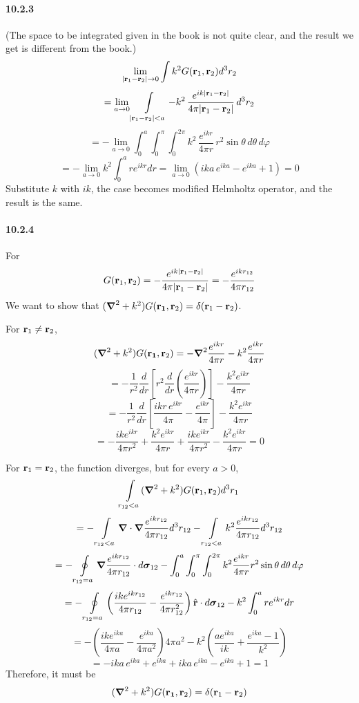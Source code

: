 \documentclass[a4paper]{article}
\begin{document}
\paragraph{10.2.3}
(The space to be integrated given in the book is not quite clear, and the result we get is different from the book.)
\[
\lim_{|\mathbf{r}_1-\mathbf{r}_2|\to0}\int k^2G(\mathbf{r}_1,\mathbf{r}_2)d^3r_2
\]
\[
=\lim_{a\to0}\int\displaylimits_{|\mathbf{r}_1-\mathbf{r}_2|<a}-k^2\,\frac{e^{ik|\mathbf{r}_1-\mathbf{r}_2|}}{4\pi |\mathbf{r}_1-\mathbf{r}_2|}\,d^3r_2
\]
\[
=-\lim_{a\to0}\int_0^a\int_0^\pi\int_0^{2\pi}k^2\,\frac{e^{ikr}}{4\pi r}\,r^2\sin\theta\,d\theta\,d\varphi
\]
\[
=-\lim_{a\to0}k^2\int_0^a re^{ikr}dr
=\lim_{a\to0}(ika\,e^{ika}-e^{ika}+1)=0
\]
Substitute $k$ with $ik$, the case becomes modified Helmholtz operator, and the result is the same.

\paragraph{10.2.4}
For
\[
G(\mathbf{r}_1,\mathbf{r}_2)=-\frac{e^{ik|\mathbf{r}_1-\mathbf{r}_2|}}{4\pi|\mathbf{r}_1-\mathbf{r}_2|}=-\frac{e^{ikr_{12}}}{4\pi r_{12}}
\]
We want to show that $(\boldsymbol{\nabla}^2+k^2)G(\mathbf{r_1},\mathbf{r}_2)=\delta(\mathbf{r}_1-\mathbf{r}_2)$.

For $\mathbf{r}_1\neq\mathbf{r}_2$, 
\[
(\boldsymbol{\nabla}^2+k^2)G(\mathbf{r_1},\mathbf{r}_2)=-\boldsymbol{\nabla}^2\frac{e^{ikr}}{4\pi r}-k^2\frac{e^{ikr}}{4\pi r}
\]
\[
=-\frac{1}{r^2}\frac{d}{dr}\left[r^2\frac{d}{dr}(\frac{e^{ikr}}{4\pi r}) \right]-\frac{k^2e^{ikr}}{4\pi r}
\]
\[
=-\frac{1}{r^2}\frac{d}{dr}\left[\frac{ikr\,e^{ikr}}{4\pi}-\frac{e^{ikr}}{4\pi} \right]-\frac{k^2e^{ikr}}{4\pi r}
\]
\[
=-\frac{ike^{ikr}}{4\pi r^2}+\frac{k^2e^{ikr}}{4\pi r}+\frac{ike^{ikr}}{4\pi r^2}-\frac{k^2e^{ikr}}{4\pi r}=0
\]

For $\mathbf{r}_1=\mathbf{r}_2$, the function diverges, but for every $a>0$,
\[
\int\displaylimits_{r_{12}<a}(\boldsymbol{\nabla}^2+k^2)G(\mathbf{r}_1,\mathbf{r}_2)d^3r_1
\]
\[
=-\int\displaylimits_{r_{12}<a}\boldsymbol{\nabla}\cdot\boldsymbol{\nabla}\frac{e^{ikr_{12}}}{4\pi r_{12}}d^3r_{12}-\int\displaylimits_{r_{12}<a}k^2\frac{e^{ikr_{12}}}{4\pi r_{12}}d^3r_{12}
\]
\[
=-\oint\displaylimits_{r_{12}=a}\boldsymbol{\nabla}\frac{e^{ikr_{12}}}{4\pi r_{12}}\cdot d\boldsymbol{\sigma}_{12}-\int_0^a\int_0^\pi\int_0^{2\pi}k^2\frac{e^{ikr}}{4\pi r}r^2\sin\theta\,d\theta\,d\varphi
\]
\[
=-\oint\displaylimits_{r_{12}=a}\left(\frac{ike^{ikr_{12}}}{4\pi r_{12}}-\frac{e^{ikr_{12}}}{4\pi r_{12}^2} \right)\hat{\mathbf{r}}\cdot d\boldsymbol{\sigma}_{12}-k^2\int_0^a re^{ikr}dr
\]
\[
=-\left(\frac{ike^{ika}}{4\pi a}-\frac{e^{ika}}{4\pi a^2} \right)4\pi a^2-k^2\left(\frac{ae^{ika}}{ik}+\frac{e^{ika}-1}{k^2} \right)
\]
\[
=-ika\,e^{ika}+e^{ika}+ika\,e^{ika}-e^{ika}+1=1
\]
Therefore, it must be
\[
(\boldsymbol{\nabla}^2+k^2)G(\mathbf{r_1},\mathbf{r}_2)=\delta(\mathbf{r}_1-\mathbf{r}_2)
\]
\end{document}
